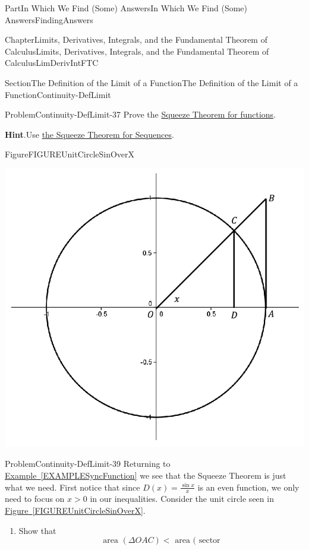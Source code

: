 \documentclass[oneside,10pt,]{book}
\newcommand{\blocktitlefont}{\relax}
\newcommand{\xreffont}{\relax}
\numberwithin{equation}{part}
\newcommand{\lt}{<}
\newcommand{\gt}{>}
\begin{document}
\begin{partptx}{Part}{In Which We Find (Some) Answers}{}{In Which We Find (Some) Answers}{}{}{FindingAnswers}
\begin{chapterptx}{Chapter}{Limits, Derivatives, Integrals, and the Fundamental Theorem of Calculus}{}{Limits, Derivatives, Integrals, and the Fundamental Theorem of Calculus}{}{}{LimDerivIntFTC}
\begin{sectionptx}{Section}{The Definition of the Limit of a Function}{}{The Definition of the Limit of a Function}{}{}{Continuity-DefLimit}
\begin{problem}{Problem}{}{Continuity-DefLimit-37}
Prove the \hyperref[thm_SqueezeTheoremFunctions]{Squeeze Theorem for functions}.%
\par\smallskip%
\noindent\textbf{\blocktitlefont Hint}.\hypertarget{Continuity-DefLimit-37-3}{}\quad{}Use \hyperref[thm_SqueezeTheorem]{the Squeeze Theorem for Sequences}.%
\end{problem}
\begin{figureptx}{Figure}{}{FIGUREUnitCircleSinOverX}{}%
\begin{image}{0.2}{0.6}{0.2}{}%
\includegraphics[width=\linewidth]{external/images/UnitCircle.png}
\end{image}%
\tcblower
\end{figureptx}%
\begin{problem}{Problem}{}{Continuity-DefLimit-39}%
Returning to \hyperref[EXAMPLESyncFunction]{Example~{\xreffont\ref{EXAMPLESyncFunction}}} we see that the Squeeze Theorem is just what we need.  First notice that since \(D(x)=\frac{\sin x}{x}\) is an even function, we only need to focus on \(x\gt0\) in our inequalities.  Consider the unit circle seen in \hyperref[FIGUREUnitCircleSinOverX]{Figure~{\xreffont\ref{FIGUREUnitCircleSinOverX}}}.%
\begin{enumerate}[font=\bfseries,label=(\alph*),ref=\alph*]%
\item{}Show that%
\begin{equation*}
\text{ area } (\Delta OAC)\lt \text{ area } (\text{ sector }

\end{equation*}
\end{enumerate}
\end{problem}
\end{sectionptx}
\end{chapterptx}
\end{partptx}
\end{document}
